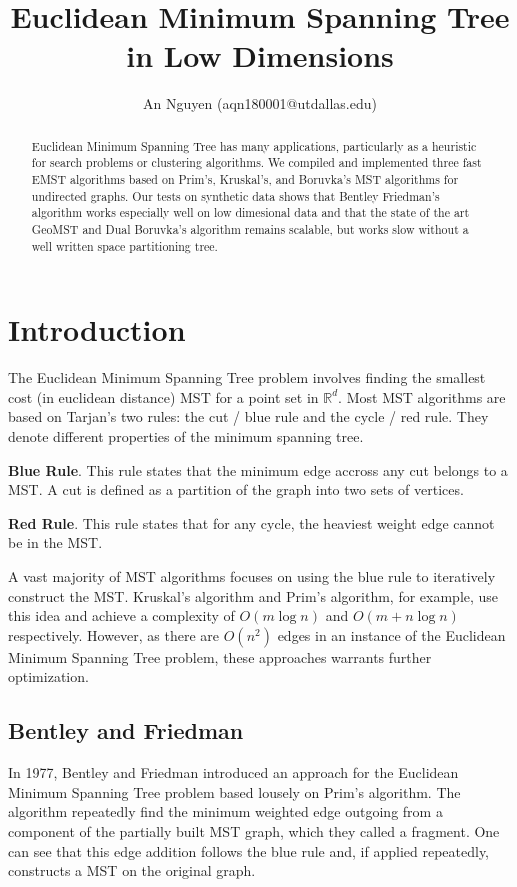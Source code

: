 \documentclass[11pt]{article}
\title{Euclidean Minimum Spanning Tree in Low Dimensions}
\author{An Nguyen (aqn180001@utdallas.edu)}
\begin{document}
\maketitle

\begin{abstract}
	Euclidean Minimum Spanning Tree has many applications, particularly as a heuristic for search problems or clustering algorithms. We compiled and implemented three fast EMST algorithms based on Prim's, Kruskal's, and Boruvka's MST algorithms for undirected graphs. Our tests on synthetic data shows that Bentley Friedman's algorithm works especially well on low dimesional data and that the state of the art GeoMST and Dual Boruvka's algorithm remains scalable, but works slow without a well written space partitioning tree.
\end{abstract}

\section{Introduction}

The  Euclidean  Minimum  Spanning  Tree  problem  involves  finding  the  smallest  cost  (in  euclidean distance) MST for a point set in $\mathbb{R}^d$. Most MST algorithms are based on Tarjan's two rules: the cut / blue rule and the cycle / red rule. They denote different properties of the minimum spanning tree.

\textbf{Blue Rule}. This rule states that the minimum edge accross any cut belongs to a MST. A cut is defined as a partition of the graph into two sets of vertices. 

\textbf{Red Rule}. This rule states that for any cycle, the heaviest weight edge cannot be in the MST.

A vast majority of MST algorithms focuses on using the blue rule to iteratively construct the MST. Kruskal's algorithm and Prim's algorithm, for example, use this idea and achieve a complexity of $O(m\log{n})$ and $O(m + n\log{n})$ respectively. However, as there are $O(n^2)$ edges in an instance of the Euclidean Minimum Spanning Tree problem, these approaches warrants further optimization. 

\subsection{Bentley and Friedman}

In 1977, Bentley and Friedman introduced an approach for the Euclidean Minimum Spanning Tree problem based lousely on Prim's algorithm.\cite{Friedman} The algorithm repeatedly find the minimum weighted edge outgoing from a component of the partially built MST graph, which they called a fragment. One can see that this edge addition follows the blue rule and, if applied repeatedly, constructs a MST on the original graph. 
\end{document}

